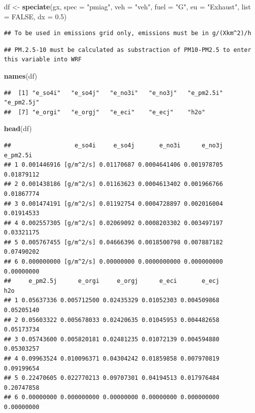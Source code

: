 \documentclass[12pt,graybox,envcountchap,sectrefs]{krantz}
\makeatletter
\newenvironment{Shaded}{\begin{snugshade}}{\end{snugshade}}
\newcommand{\KeywordTok}[1]{\textcolor[rgb]{0.13,0.29,0.53}{\textbf{#1}}}
\newcommand{\DataTypeTok}[1]{\textcolor[rgb]{0.13,0.29,0.53}{#1}}
\newcommand{\FloatTok}[1]{\textcolor[rgb]{0.00,0.00,0.81}{#1}}
\newcommand{\StringTok}[1]{\textcolor[rgb]{0.31,0.60,0.02}{#1}}
\newcommand{\OtherTok}[1]{\textcolor[rgb]{0.56,0.35,0.01}{#1}}
\newcommand{\NormalTok}[1]{#1}
\newenvironment{kframe}{%
\medskip{}
\setlength{\fboxsep}{.8em}
 \def\at@end@of@kframe{}%
 \ifinner\ifhmode%
  \def\at@end@of@kframe{\end{minipage}}%
  \begin{minipage}{\columnwidth}%
 \fi\fi%
 \def\FrameCommand##1{\hskip\@totalleftmargin \hskip-\fboxsep
 \colorbox{shadecolor}{##1}\hskip-\fboxsep
     \hskip-\linewidth \hskip-\@totalleftmargin \hskip\columnwidth}%
 \MakeFramed {\advance\hsize-\width
   \@totalleftmargin\z@ \linewidth\hsize
   \@setminipage}}%
 {\par\unskip\endMakeFramed%
 \at@end@of@kframe}
\renewenvironment{Shaded}{\begin{kframe}}{\end{kframe}}
\theoremstyle{definition}
\theoremstyle{definition}
\theoremstyle{definition}
\theoremstyle{remark}
\makeatother
\begin{document}
\begin{Shaded}
\begin{Highlighting}[]
\NormalTok{df <-}\StringTok{ }\KeywordTok{speciate}\NormalTok{(gx, }\DataTypeTok{spec =} \StringTok{"pmiag"}\NormalTok{, }\DataTypeTok{veh =} \StringTok{"veh"}\NormalTok{, }\DataTypeTok{fuel =} \StringTok{"G"}\NormalTok{,}
               \DataTypeTok{eu =} \StringTok{"Exhaust"}\NormalTok{, }\DataTypeTok{list =} \OtherTok{FALSE}\NormalTok{, }\DataTypeTok{dx =} \FloatTok{0.5}\NormalTok{)}
\end{Highlighting}
\end{Shaded}

\begin{verbatim}
## To be used in emissions grid only, emissions must be in g/(Xkm^2)/h
\end{verbatim}

\begin{verbatim}
## PM.2.5-10 must be calculated as substraction of PM10-PM2.5 to enter this variable into WRF
\end{verbatim}

\begin{Shaded}
\begin{Highlighting}[]
\KeywordTok{names}\NormalTok{(df)}
\end{Highlighting}
\end{Shaded}

\begin{verbatim}
##  [1] "e_so4i"   "e_so4j"   "e_no3i"   "e_no3j"   "e_pm2.5i" "e_pm2.5j"
##  [7] "e_orgi"   "e_orgj"   "e_eci"    "e_ecj"    "h2o"
\end{verbatim}

\begin{Shaded}
\begin{Highlighting}[]
\KeywordTok{head}\NormalTok{(df)}
\end{Highlighting}
\end{Shaded}

\begin{verbatim}
##                  e_so4i     e_so4j       e_no3i      e_no3j   e_pm2.5i
## 1 0.001446916 [g/m^2/s] 0.01170687 0.0004641406 0.001978705 0.01879112
## 2 0.001438186 [g/m^2/s] 0.01163623 0.0004613402 0.001966766 0.01867774
## 3 0.001474191 [g/m^2/s] 0.01192754 0.0004728897 0.002016004 0.01914533
## 4 0.002557305 [g/m^2/s] 0.02069092 0.0008203302 0.003497197 0.03321175
## 5 0.005767455 [g/m^2/s] 0.04666396 0.0018500798 0.007887182 0.07490202
## 6 0.000000000 [g/m^2/s] 0.00000000 0.0000000000 0.000000000 0.00000000
##     e_pm2.5j      e_orgi     e_orgj      e_eci       e_ecj        h2o
## 1 0.05637336 0.005712500 0.02435329 0.01052303 0.004509868 0.05205140
## 2 0.05603322 0.005678033 0.02420635 0.01045953 0.004482658 0.05173734
## 3 0.05743600 0.005820181 0.02481235 0.01072139 0.004594880 0.05303257
## 4 0.09963524 0.010096371 0.04304242 0.01859858 0.007970819 0.09199654
## 5 0.22470605 0.022770213 0.09707301 0.04194513 0.017976484 0.20747858
## 6 0.00000000 0.000000000 0.00000000 0.00000000 0.000000000 0.00000000
\end{verbatim}
\end{document}
